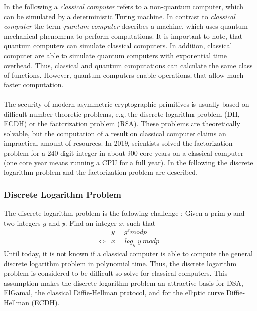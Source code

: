 In the following a \textit{classical computer} refers to a non-quantum computer, which can be simulated by a deterministic Turing machine. In contrast to \textit{classical computer} the term \textit{quantum computer} describes a machine, which uses quantum mechanical phenomena to perform computations. It is important to note, that quantum computers can simulate classical computers. In addition, classical computer are able to simulate quantum computers with exponential time overhead. Thus, classical and quantum computations can calculate the same class of functions. However, quantum computers enable operations, that allow much faster computation.
 \parencite{nielsen2002quantum} \\\\
The security of modern asymmetric cryptographic primitives is usually based on difficult number theoretic problems, e.g. the discrete logarithm problem (DH, ECDH) or the factorization problem (RSA). \parencite{chen2016report} These problems are theoretically solvable, but the computation of a result on classical computer claims an impractical amount of resources. In 2019, scientists solved the factorization problem for a 240 digit integer in about 900 core-years on a classical computer (one core year means running a CPU for a full year). \parencite{boudot2795} In the following the discrete logarithm problem and the factorization problem are described.

\subsubsection{Discrete Logarithm Problem} \label{discrete_log_problem}
The discrete logarithm problem is the following challenge \parencite{beutelspacher2010diskrete}: Given a prim $p$ and two integers $g$ and $y$. Find an integer $x$, such that
\begin{equation*}
\begin{split}
&y = g^x mod p \\
\iff &x = log_g\;y\:mod p
\end{split}
\end{equation*}
Until today, it is not known if a classical computer is able to compute the general discrete logarithm problem in polynomial time. Thus, the discrete logarithm problem is considered to be difficult so solve for classical computers.  \parencite{beutelspacher2010diskrete} This assumption makes the discrete logarithm problem an attractive basis for DSA, ElGamal, the classical Diffie-Hellman protocol, and for the elliptic curve Diffie-Hellman (ECDH).


